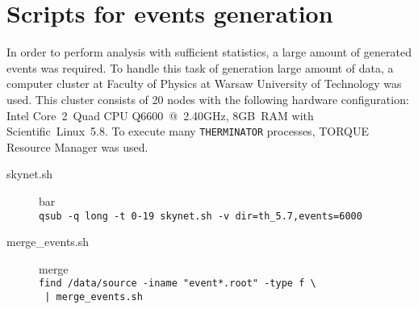 %
\chapter{Scripts for events generation}
  In order to perform analysis with sufficient statistics, a large amount of generated events was required.
  To handle this task of generation large amount of data, a computer cluster at Faculty of Physics at Warsaw University of Technology was used.
  This cluster consists of 20 nodes with the following hardware configuration: \mbox{Intel\textregistered} \mbox{Core\texttrademark~2 Quad} CPU \mbox{Q6600 @ 2.40GHz,} \mbox{8GB RAM} with Scientific~Linux~5.8.
  To execute many \verb|THERMINATOR| processes, TORQUE~\cite{torque} Resource Manager was used.
  \begin{description}
    \item[skynet.sh] bar
      \\\verb|qsub -q long -t 0-19 skynet.sh -v dir=th_5.7,events=6000|
    \item[merge\_events.sh] merge
      \\\verb&find /data/source -iname "event*.root" -type f \&
      \\\verb& | merge_events.sh&
  \end{description}